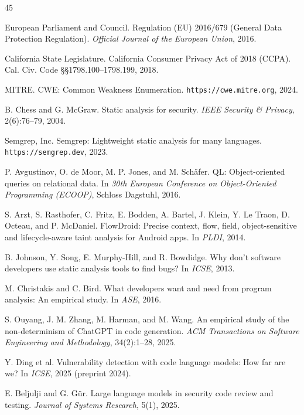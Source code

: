\documentclass[runningheads]{llncs}
\begin{document}
\begin{thebibliography}{45}
\setlength{\itemsep}{0pt}\setlength{\parsep}{0pt}
\providecommand{\url}[1]{\texttt{#1}}
\providecommand{\urlprefix}{}

 European Parliament and Council. Regulation (EU) 2016/679 (General Data Protection Regulation). \emph{Official Journal of the European Union}, 2016.

 California State Legislature. California Consumer Privacy Act of 2018 (CCPA). Cal. Civ. Code \S\S 1798.100--1798.199, 2018.

 MITRE. CWE: Common Weakness Enumeration. \url{https://cwe.mitre.org}, 2024.

 B. Chess and G. McGraw. Static analysis for security. \emph{IEEE Security \& Privacy}, 2(6):76--79, 2004.

 Semgrep, Inc. Semgrep: Lightweight static analysis for many languages. \url{https://semgrep.dev}, 2023.

 P. Avgustinov, O. de Moor, M. P. Jones, and M. Sch\"afer. QL: Object-oriented queries on relational data. In \emph{30th European Conference on Object-Oriented Programming (ECOOP)}, Schloss Dagstuhl, 2016.

 S. Arzt, S. Rasthofer, C. Fritz, E. Bodden, A. Bartel, J. Klein, Y. Le Traon, D. Octeau, and P. McDaniel. FlowDroid: Precise context, flow, field, object-sensitive and lifecycle-aware taint analysis for Android apps. In \emph{PLDI}, 2014.

 B. Johnson, Y. Song, E. Murphy-Hill, and R. Bowdidge. Why don't software developers use static analysis tools to find bugs? In \emph{ICSE}, 2013.

 M. Christakis and C. Bird. What developers want and need from program analysis: An empirical study. In \emph{ASE}, 2016.

 S. Ouyang, J. M. Zhang, M. Harman, and M. Wang. An empirical study of the non-determinism of ChatGPT in code generation. \emph{ACM Transactions on Software Engineering and Methodology}, 34(2):1--28, 2025.

 Y. Ding et al. Vulnerability detection with code language models: How far are we? In \emph{ICSE}, 2025 (preprint 2024).

 E. Beljulji and G. G\"ur. Large language models in security code review and testing. \emph{Journal of Systems Research}, 5(1), 2025.


\end{thebibliography}
\end{document}
